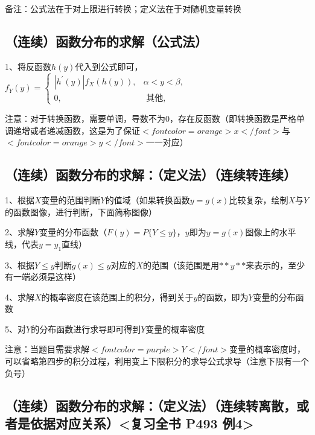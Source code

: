 备注：公式法在于对上限进行转换；定义法在于对随机变量转换



\subsection{（连续）函数分布的求解（公式法）}

1、将反函数$ h(y) $代入到公式即可，$ f_{Y}(y)=\left\{\begin{array}{cc}\left|h^{\prime}(y)\right| f_{X}(h(y)), & \alpha<y<\beta, \\0, & \text { 其他, }\end{array}\right. $

注意：对于转换函数，需要单调，导数不为0，存在反函数（即转换函数是严格单调递增或者递减函数，这是为了保证$ <font color=orange>x</font> $与$ <font color=orange>y</font> $一一对应）



\subsection{（连续）函数分布的求解：（定义法）（连续转连续）}

1、根据$ X $变量的范围判断$ Y $的值域（如果转换函数$ y=g(x) $比较复杂，绘制$ X $与$ Y $的函数图像，进行判断，下面简称图像）

2、求解$ Y $变量的分布函数（$ F(y)=P\{ Y \leqslant y \} $，$ y $即为$ y=g(x) $图像上的水平线，代表$ y=y_1 $直线）

3、根据$ Y\leqslant y $判断$ g(x) \leqslant y $对应的$ X $的范围（该范围是用$ **y** $来表示的，至少有一端必须是这样）

4、求解$ X $的概率密度在该范围上的积分，得到关于$ y $的函数，即为$ Y $变量的分布函数

5、对$ Y $的分布函数进行求导即可得到$ Y $变量的概率密度

注意：当题目需要求解$ <font color=purple>Y</font> $变量的概率密度时，可以省略第四步的积分过程，利用变上下限积分的求导公式求导（注意下限有一个负号）



\subsection{（连续）函数分布的求解：（定义法）（连续转离散，或者是依据对应关系）<复习全书 P493 例4>}

